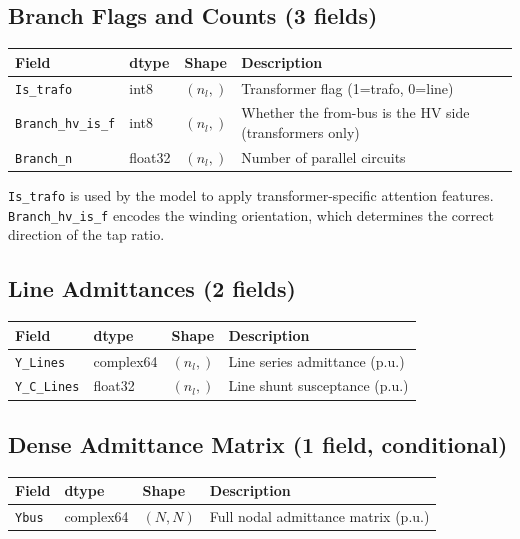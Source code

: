 \documentclass{article}
\begin{document}
\subsection{Branch Flags and Counts (3 fields)}

\begin{table}[h]
\centering
\begin{tabular}{llll}
\toprule
Field & dtype & Shape & Description \\
\midrule
\texttt{Is\_trafo}      & int8   & $(n_l,)$ & Transformer flag (1=trafo, 0=line) \\
\texttt{Branch\_hv\_is\_f} & int8 & $(n_l,)$ &
  Whether the from-bus is the HV side (transformers only) \\
\texttt{Branch\_n}      & float32 & $(n_l,)$ & Number of parallel circuits \\
\bottomrule
\end{tabular}
\end{table}

\texttt{Is\_trafo} is used by the model to apply transformer-specific
attention features.  \texttt{Branch\_hv\_is\_f} encodes the winding
orientation, which determines the correct direction of the tap ratio.

\subsection{Line Admittances (2 fields)}

\begin{table}[h]
\centering
\begin{tabular}{llll}
\toprule
Field & dtype & Shape & Description \\
\midrule
\texttt{Y\_Lines}   & complex64 & $(n_l,)$ &
  Line series admittance (p.u.) \\
\texttt{Y\_C\_Lines} & float32  & $(n_l,)$ &
  Line shunt susceptance (p.u.) \\
\bottomrule
\end{tabular}
\end{table}

\subsection{Dense Admittance Matrix (1 field, conditional)}

\begin{table}[h]
\centering
\begin{tabular}{llll}
\toprule
Field & dtype & Shape & Description \\
\midrule
\texttt{Ybus} & complex64 & $(N, N)$ &
  Full nodal admittance matrix (p.u.) \\
\bottomrule
\end{tabular}
\end{table}
\end{document}
